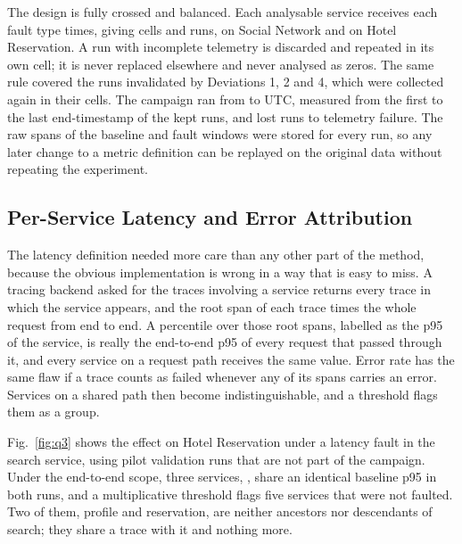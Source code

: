 The design is fully crossed and balanced. Each analysable service receives each fault type
 times, giving  cells and
 runs,  on Social Network and  on Hotel
Reservation. A run with incomplete telemetry is discarded and repeated in its own cell; it is
never replaced elsewhere and never analysed as zeros. The same rule covered the
 runs invalidated by Deviations 1, 2 and 4, which were
collected again in their cells. %
The campaign ran from  to  UTC, measured from the
first to the last end-timestamp of the kept runs, and lost  runs to
telemetry failure. The raw spans of the baseline and fault windows were stored for every run,
so any later change to a metric definition can be replayed on the original data without
repeating the experiment.

\subsection{Per-Service Latency and Error Attribution}
\label{sec:attribution}

The latency definition needed more care than any other part of the method, because the obvious
implementation is wrong in a way that is easy to miss. A tracing backend asked for the traces
involving a service returns every trace in which the service appears, and the root span of each
trace times the whole request from end to end. A percentile over those root spans, labelled as
the p95 of the service, is really the end-to-end p95 of every request that passed through it,
and every service on a request path receives the same value. Error rate has the same flaw if a
trace counts as failed whenever any of its spans carries an error. Services on a shared path
then become indistinguishable, and a threshold flags them as a group.

Fig.~\ref{fig:q3} shows the effect on Hotel Reservation under a latency fault in the search
service, using  pilot validation runs that are not part of the campaign.
Under the end-to-end scope, three services, %
, share an identical baseline p95 in both runs, and a
multiplicative threshold flags five services that were not faulted.
Two of them, profile and reservation, are neither ancestors nor descendants of search; they
share a trace with it and nothing more.


